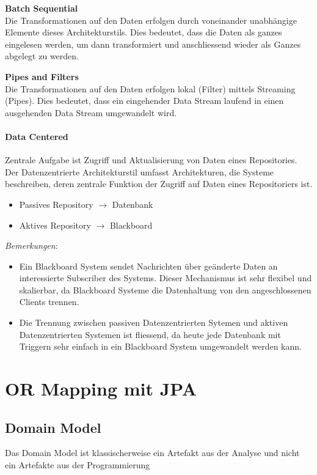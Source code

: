 \documentclass{report}
\theoremstyle{definition}
\theoremstyle{example}
\begin{document}
\textbf{Batch Sequential}\\
Die Transformationen auf den Daten erfolgen durch voneinander unabhängige Elemente dieses Architekturstils. Dies bedeutet, dass die Daten als ganzes eingelesen werden, um dann transformiert und anschliessend wieder als Ganzes abgelegt zu werden.

\textbf{Pipes and Filters}\\
Die Transformationen auf den Daten erfolgen lokal (Filter) mittels Streaming (Pipes). Dies bedeutet, dass ein eingehender Data Stream laufend in einen ausgehenden Data Stream umgewandelt wird.

\subsubsection{Data Centered}
Zentrale Aufgabe ist Zugriff und Aktualisierung von Daten eines Repositories.\\
Der Datenzentrierte Architekturstil umfasst Architekturen, die Systeme beschreiben, deren zentrale Funktion der Zugriff auf Daten eines Repositoriers ist.
\begin{itemize}
	\item Passives Repository $\rightarrow$ Datenbank
	\item Aktives Repository $\rightarrow$ Blackboard
\end{itemize}
\textit{Bemerkungen}:\\
\begin{itemize}
	\item Ein Blackboard System sendet Nachrichten über geänderte Daten an interessierte Subscriber des Systems. Dieser Mechanismus ist sehr flexibel und skalierbar, da Blackboard Systeme die Datenhaltung von den angeschlossenen Clients trennen.
	\item Die Trennung zwischen passiven Datenzentrierten Sytemen und aktiven Datenzentrierten Systemen ist fliessend, da heute jede Datenbank mit Triggern sehr einfach in ein Blackboard System umgewandelt werden kann.
\end{itemize}

\chapter{OR Mapping mit JPA}

\section{Domain Model}
Das Domain Model ist klassischerweise ein Artefakt aus der Analyse und nicht ein Artefakte aus der Programmierung
\end{document}
